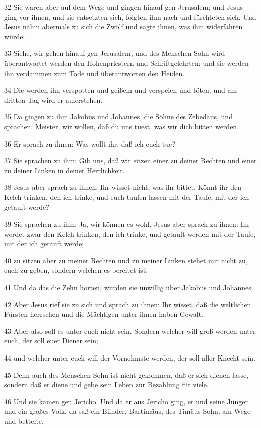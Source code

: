 \par 32 Sie waren aber auf dem Wege und gingen hinauf gen Jerusalem; und Jesus ging vor ihnen, und sie entsetzten sich, folgten ihm nach und fürchteten sich. Und Jesus nahm abermals zu sich die Zwölf und sagte ihnen, was ihm widerfahren würde:
\par 33 Siehe, wir gehen hinauf gen Jerusalem, und des Menschen Sohn wird überantwortet werden den Hohenpriestern und Schriftgelehrten; und sie werden ihn verdammen zum Tode und überantworten den Heiden.
\par 34 Die werden ihn verspotten und geißeln und verspeien und töten; und am dritten Tag wird er auferstehen.
\par 35 Da gingen zu ihm Jakobus und Johannes, die Söhne des Zebedäus, und sprachen: Meister, wir wollen, daß du uns tuest, was wir dich bitten werden.
\par 36 Er sprach zu ihnen: Was wollt ihr, daß ich euch tue?
\par 37 Sie sprachen zu ihm: Gib uns, daß wir sitzen einer zu deiner Rechten und einer zu deiner Linken in deiner Herrlichkeit.
\par 38 Jesus aber sprach zu ihnen: Ihr wisset nicht, was ihr bittet. Könnt ihr den Kelch trinken, den ich trinke, und euch taufen lassen mit der Taufe, mit der ich getauft werde?
\par 39 Sie sprachen zu ihm: Ja, wir können es wohl. Jesus aber sprach zu ihnen: Ihr werdet zwar den Kelch trinken, den ich trinke, und getauft werden mit der Taufe, mit der ich getauft werde;
\par 40 zu sitzen aber zu meiner Rechten und zu meiner Linken stehet mir nicht zu, euch zu geben, sondern welchen es bereitet ist.
\par 41 Und da das die Zehn hörten, wurden sie unwillig über Jakobus und Johannes.
\par 42 Aber Jesus rief sie zu sich und sprach zu ihnen: Ihr wisset, daß die weltlichen Fürsten herrschen und die Mächtigen unter ihnen haben Gewalt.
\par 43 Aber also soll es unter euch nicht sein. Sondern welcher will groß werden unter euch, der soll euer Diener sein;
\par 44 und welcher unter euch will der Vornehmste werden, der soll aller Knecht sein.
\par 45 Denn auch des Menschen Sohn ist nicht gekommen, daß er sich dienen lasse, sondern daß er diene und gebe sein Leben zur Bezahlung für viele.
\par 46 Und sie kamen gen Jericho. Und da er aus Jericho ging, er und seine Jünger und ein großes Volk, da saß ein Blinder, Bartimäus, des Timäus Sohn, am Wege und bettelte.
